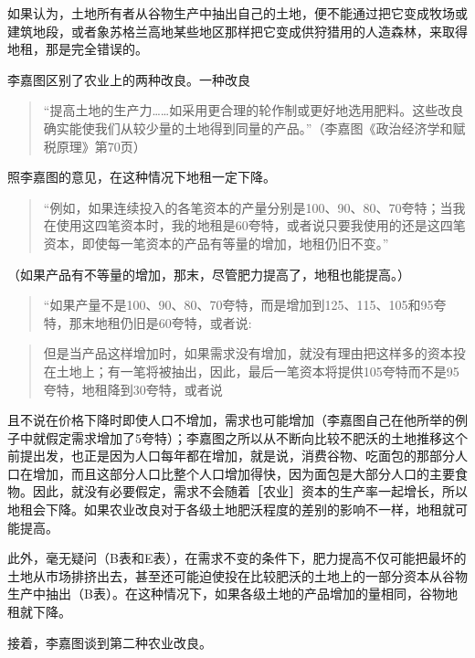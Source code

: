 如果认为，土地所有者从谷物生产中抽出自己的土地，便不能通过把它变成牧场或建筑地段，或者象苏格兰高地某些地区那样把它变成供狩猎用的人造森林，来取得地租，那是完全错误的。

李嘉图区别了农业上的两种改良。一种改良

\begin{quote}“提高土地的生产力……如采用更合理的轮作制或更好地选用肥料。这些改良确实能使我们从较少量的土地得到同量的产品。”（李嘉图《政治经济学和赋税原理》第70页）\end{quote}

照李嘉图的意见，在这种情况下地租一定下降。

\begin{quote}“例如，如果连续投入的各笔资本的产量分别是100、90、80、70夸特；当我在使用这四笔资本时，我的地租是60夸特，或者说只要我使用的还是这四笔资本，即使每一笔资本的产品有等量的增加，地租仍旧不变。”\end{quote}

（如果产品有不等量的增加，那末，尽管肥力提高了，地租也能提高。）

\todo{}

\begin{quote}“如果产量不是100、90、80、70夸特，而是增加到125、115、105和95夸特，那末地租仍旧是60夸特，或者说:\end{quote}

\todo{}

\begin{quote}但是当产品这样增加时，如果需求没有增加，就没有理由把这样多的资本投在土地上；有一笔将被抽出，因此，最后一笔资本将提供105夸特而不是95夸特，地租降到30夸特，或者说\end{quote}

\todo{}

且不说在价格下降时即使人口不增加，需求也可能增加（李嘉图自己在他所举的例子中就假定需求增加了5夸特）；李嘉图之所以从不断向比较不肥沃的土地推移这个前提出发，也正是因为人口每年都在增加，就是说，消费谷物、吃面包的那部分人口在增加，而且这部分人口比整个人口增加得快，因为面包是大部分人口的主要食物。因此，就没有必要假定，需求不会随着［农业］资本的生产率一起增长，所以地租会下降。如果农业改良对于各级土地肥沃程度的差别的影响不一样，地租就可能提高。

此外，毫无疑问（B表和E表），在需求不变的条件下，肥力提高不仅可能把最坏的土地从市场排挤出去，甚至还可能迫使投在比较肥沃的土地上的一部分资本从谷物生产中抽出（B表）。在这种情况下，如果各级土地的产品增加的量相同，谷物地租就下降。

接着，李嘉图谈到第二种农业改良。

